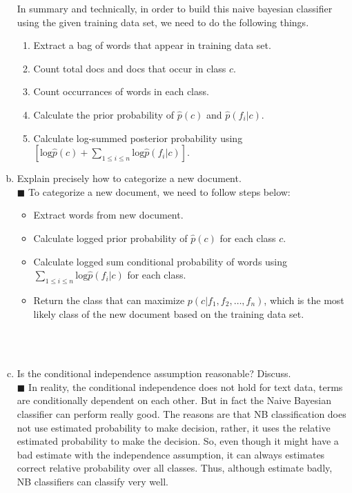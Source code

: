 \documentclass{article}
\newcommand{\solution}[1]{~\\ $\blacksquare$ \sffamily\upshape\selectfont #1
\normalfont ~\\~ }
\begin{document}
\begin{enumerate}[a.]
{    In summary and technically, in order to build this naive bayesian
    classifier using the given training data set, we need to do the
    following things.  \\ 
    \begin{enumerate}
    \item Extract a bag of words that appear in training data set. 
    \item Count total docs and docs that occur in class $c$. 
    \item Count occurrances of words in each class. 
    \item Calculate the prior probability of $\hat{p}(c)$ and
      $\hat{p}(f_i|c)$. 
    \item Calculate log-summed posterior probability using
      $[\mbox{log}\hat{p}(c)+\sum_{1\leq i \leq
        n}\mbox{log}\hat{p}(f_i|c)]$. 
     \end{enumerate}
  }
\item Explain precisely how to categorize a new document. 
  \solution{To categorize a new document, we need to follow steps
    below: \\ 
  \begin{itemize}
    \item Extract words from new document. 
    \item Calculate logged prior probability of $\hat{p}(c)$ for each class
      $c$. 
    \item Calculate logged sum conditional probability of words using
      $\sum_{1\leq i \leq n}\mbox{log}\hat{p}(f_i|c)$ for each class. 
    \item Return the class that can maximize $p(c|f_1,f_2,\ldots,f_n)$,
      which is the most likely class of the new document based on the
      training data set. 
  \end{itemize}
}
\item Is the conditional independence assumption reasonable? Discuss. 
  \solution{In reality, the conditional independence does not hold for text
  data, terms are conditionally dependent on each other. But in fact
  the Naive Bayesian classifier can perform really good. The reasons
  are that NB classification does not use estimated probability to
  make decision, rather, it uses the relative estimated probability to
  make the decision. So, even though it might have a bad estimate with the
  independence assumption, it can always estimates correct relative
  probability over all classes. Thus, although estimate badly, NB
  classifiers can classify very well. }
\end{enumerate}
\end{document}
